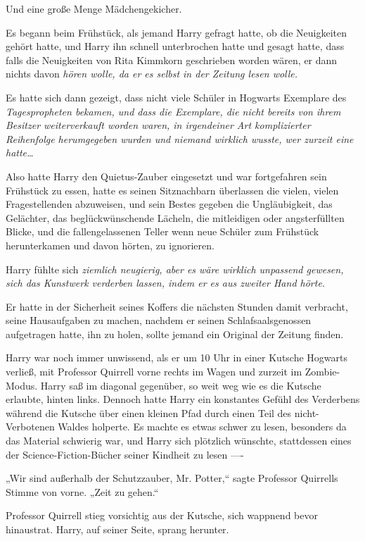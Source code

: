 {Und eine große Menge Mädchengekicher.

Es begann beim Frühstück, als jemand Harry gefragt hatte, ob die Neuigkeiten gehört hatte, und Harry ihn schnell unterbrochen hatte und gesagt hatte, dass falls die Neuigkeiten von Rita Kimmkorn geschrieben worden wären, er dann nichts davon \emph{hören wolle, da er es selbst in der Zeitung lesen wolle.}

Es hatte sich dann gezeigt, dass nicht viele Schüler in Hogwarts Exemplare des \emph{Tagespropheten bekamen, und dass die Exemplare, die nicht bereits von ihrem Besitzer weiterverkauft worden waren, in irgendeiner Art komplizierter Reihenfolge herumgegeben wurden und niemand wirklich wusste, wer zurzeit eine hatte…}

Also hatte Harry den Quietus-Zauber eingesetzt und war fortgefahren sein Frühstück zu essen, hatte es seinen Sitznachbarn überlassen die vielen, vielen Fragestellenden abzuweisen, und sein Bestes gegeben die Ungläubigkeit, das Gelächter, das beglückwünschende Lächeln, die mitleidigen oder angsterfüllten Blicke, und die fallengelassenen Teller wenn neue Schüler zum Frühstück herunterkamen und davon hörten, zu ignorieren.

Harry fühlte sich \emph{ziemlich neugierig, aber es wäre \emph{wirklich} unpassend gewesen, sich das Kunstwerk verderben lassen, indem er es aus zweiter Hand hörte.}

Er hatte in der Sicherheit seines Koffers die nächsten Stunden damit verbracht, seine Hausaufgaben zu machen, nachdem er seinen Schlafsaalsgenossen aufgetragen hatte, ihn zu holen, sollte jemand ein Original der Zeitung finden.

Harry war noch immer unwissend, als er um 10 Uhr in einer Kutsche Hogwarts verließ, mit Professor Quirrell vorne rechts im Wagen und zurzeit im Zombie-Modus. Harry saß im diagonal gegenüber, so weit weg wie es die Kutsche erlaubte, hinten links. Dennoch hatte Harry ein konstantes Gefühl des Verderbens während die Kutsche über einen kleinen Pfad durch einen Teil des nicht-Verbotenen Waldes holperte. Es machte es etwas schwer zu lesen, besonders da das Material schwierig war, und Harry sich plötzlich wünschte, stattdessen eines der Science-Fiction-Bücher seiner Kindheit zu lesen ----

„Wir sind außerhalb der Schutzzauber, Mr. Potter,“ sagte Professor Quirrells Stimme von vorne. „Zeit zu gehen.“

Professor Quirrell stieg vorsichtig aus der Kutsche, sich wappnend bevor hinaustrat. Harry, auf seiner Seite, sprang herunter.

}
